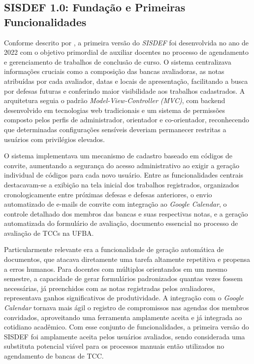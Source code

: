\documentclass[nonacm, sigconf]{acmart}
\begin{document}
\subsection{SISDEF 1.0: Fundação e Primeiras Funcionalidades}

Conforme descrito por \cite{gabrieltcc}, a primeira versão do \textit{SISDEF} foi desenvolvida no ano de 2022 com o objetivo primordial de auxiliar docentes no processo de agendamento e gerenciamento de trabalhos de conclusão de curso. O sistema centralizava informações cruciais como a composição das bancas avaliadoras, as notas atribuídas por cada avaliador, datas e locais de apresentação, facilitando a busca por defesas futuras e conferindo maior visibilidade aos trabalhos cadastrados. A arquitetura seguia o padrão \textit{Model-View-Controller (MVC)}, com backend desenvolvido em tecnologias web tradicionais e um sistema de permissões composto pelos perfis de administrador, orientador e co-orientador, reconhecendo que determinadas configurações sensíveis deveriam permanecer restritas a usuários com privilégios elevados.

O sistema implementava um mecanismo de cadastro baseado em códigos de convite, aumentando a segurança do acesso administrativo ao exigir a geração individual de códigos para cada novo usuário. Entre as funcionalidades centrais destacavam-se a exibição na tela inicial dos trabalhos registrados, organizados cronologicamente entre próximas defesas e defesas anteriores, o envio automatizado de e-mails de convite com integração ao \textit{Google Calendar}, o controle detalhado dos membros das bancas e suas respectivas notas, e a geração automatizada do formulário de avaliação, documento essencial no processo de avaliação de TCCs na UFBA.

Particularmente relevante era a funcionalidade de geração automática de documentos, que atacava diretamente uma tarefa altamente repetitiva e propensa a erros humanos. Para docentes com múltiplos orientandos em um mesmo semestre, a capacidade de gerar formulários padronizados quantas vezes fossem necessárias, já preenchidos com as notas registradas pelos avaliadores, representava ganhos significativos de produtividade. A integração com o \textit{Google Calendar} tornava mais ágil o registro de compromissos nas agendas dos membros convidados, aproveitando uma ferramenta amplamente aceita e já integrada ao cotidiano acadêmico. Com esse conjunto de funcionalidades, a primeira versão do SISDEF foi amplamente aceita pelos usuários avaliados, sendo considerada uma substituta potencial viável para os processos manuais então utilizados no agendamento de bancas de TCC.
\end{document}
